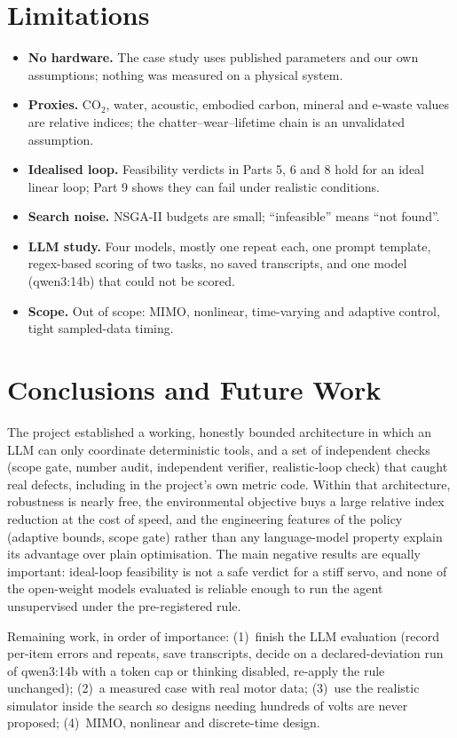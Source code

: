\documentclass[a4paper,11pt]{article}
\begin{document}
\section{Limitations}
\begin{itemize}[nosep]
\item \textbf{No hardware.} The case study uses published parameters and our own assumptions; nothing was measured on a physical system.
\item \textbf{Proxies.} CO$_2$, water, acoustic, embodied carbon, mineral and e-waste values are relative indices; the chatter--wear--lifetime chain is an unvalidated assumption.
\item \textbf{Idealised loop.} Feasibility verdicts in Parts 5, 6 and 8 hold for an ideal linear loop; Part 9 shows they can fail under realistic conditions.
\item \textbf{Search noise.} NSGA-II budgets are small; ``infeasible'' means ``not found''.
\item \textbf{LLM study.} Four models, mostly one repeat each, one prompt template, regex-based scoring of two tasks, no saved transcripts, and one model (qwen3:14b) that could not be scored.
\item \textbf{Scope.} Out of scope: MIMO, nonlinear, time-varying and adaptive control, tight sampled-data timing.
\end{itemize}

\section{Conclusions and Future Work}
The project established a working, honestly bounded architecture in which an LLM can only coordinate deterministic tools, and a set of independent checks (scope gate, number audit, independent verifier, realistic-loop check) that caught real defects, including in the project's own metric code. Within that architecture, robustness is nearly free, the environmental objective buys a large relative index reduction at the cost of speed, and the engineering features of the policy (adaptive bounds, scope gate) rather than any language-model property explain its advantage over plain optimisation. The main negative results are equally important: ideal-loop feasibility is not a safe verdict for a stiff servo, and none of the open-weight models evaluated is reliable enough to run the agent unsupervised under the pre-registered rule.

Remaining work, in order of importance: (1)~finish the LLM evaluation (record per-item errors and repeats, save transcripts, decide on a declared-deviation run of qwen3:14b with a token cap or thinking disabled, re-apply the rule unchanged); (2)~a measured case with real motor data; (3)~use the realistic simulator inside the search so designs needing hundreds of volts are never proposed; (4)~MIMO, nonlinear and discrete-time design.
\end{document}
